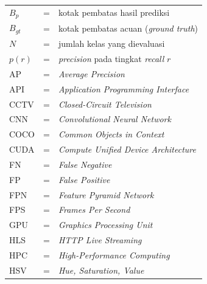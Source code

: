 \begin{tabular}{llp{3in}}
	$B_{p}$	& \hspace{1.5cm} = & kotak pembatas hasil prediksi \\
	$B_{gt}$ & \hspace{1.5cm} = & kotak pembatas acuan (\textit{ground truth}) \\
	$N$	& \hspace{1.5cm} = & jumlah kelas yang dievaluasi \\
	$p(r)$	& \hspace{1.5cm} = & \textit{precision} pada tingkat \textit{recall} $r$ \\
	AP	&  \hspace{1.5cm} = & \textit{Average Precision} \\
	API	&  \hspace{1.5cm} = & \textit{Application Programming Interface} \\
	CCTV	&  \hspace{1.5cm} = & \textit{Closed-Circuit Television} \\
	CNN	&  \hspace{1.5cm} = & \textit{Convolutional Neural Network} \\
	COCO	&  \hspace{1.5cm} = & \textit{Common Objects in Context} \\
	CUDA	&  \hspace{1.5cm} = & \textit{Compute Unified Device Architecture} \\
	FN	&  \hspace{1.5cm} = & \textit{False Negative} \\
	FP	&  \hspace{1.5cm} = & \textit{False Positive} \\
	FPN	&  \hspace{1.5cm} = & \textit{Feature Pyramid Network} \\
	FPS	&  \hspace{1.5cm} = & \textit{Frames Per Second} \\
	GPU	&  \hspace{1.5cm} = & \textit{Graphics Processing Unit} \\
	HLS	&  \hspace{1.5cm} = & \textit{HTTP Live Streaming} \\
	HPC	&  \hspace{1.5cm} = & \textit{High-Performance Computing} \\
	HSV	&  \hspace{1.5cm} = & \textit{Hue, Saturation, Value} \\

\end{tabular}

